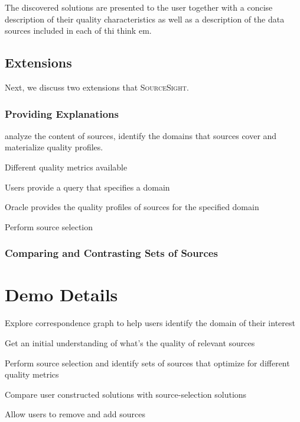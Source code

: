 \documentclass{vldb}
\newcommand\system{\textsc{SourceSight}}
\begin{document}
The discovered solutions are presented to the user together with a concise description of their quality characteristics as well as a description of the data sources included in each of thi think em. 

\subsection{Extensions}
\label{sec:extensions}
Next, we discuss two extensions that \system.
\subsubsection{Providing Explanations}

analyze the content of sources, identify the domains that sources cover and materialize quality profiles. 

Different quality metrics available 

Users provide a query that specifies a domain

Oracle provides the quality profiles of sources for the specified domain

Perform source selection

\subsubsection{Comparing and Contrasting Sets of Sources}


\section{Demo Details}

Explore correspondence graph to help users identify the domain of their interest

Get an initial understanding of what's the quality of relevant sources

Perform source selection and identify sets of sources that optimize for different
quality metrics

Compare user constructed solutions with source-selection solutions

Allow users to remove and add sources



\end{document}
